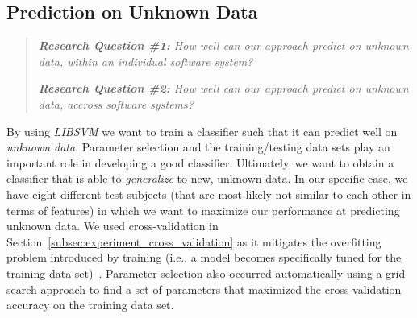 \subsection{Prediction on Unknown Data}
\label{subsec:experiment_prediction}
\begin{quote}
  \emph{\textbf{Research Question \#1:} How well can our approach predict on unknown data, within an individual software system?}
  
  \emph{\textbf{Research Question \#2:} How well can our approach predict on unknown data, accross software systems?}
\end{quote}

\noindent
By using \emph{LIBSVM} we want to train a classifier such that it can predict well on \emph{unknown data}. Parameter selection and the training/testing data sets play an important role in developing a good classifier. Ultimately, we want to obtain a classifier that is able to \emph{generalize} to new, unknown data. In our specific case, we have eight different test subjects (that are most likely not similar to each other in terms of features) in which we want to maximize our performance at predicting unknown data. We used cross-validation in Section~\ref{subsec:experiment_cross_validation} as it mitigates the overfitting problem introduced by training (i.e., a model becomes specifically tuned for the training data set)~\cite{HCL03}. Parameter selection also occurred automatically using a grid search approach to find a set of parameters that maximized the cross-validation accuracy on the training data set.

